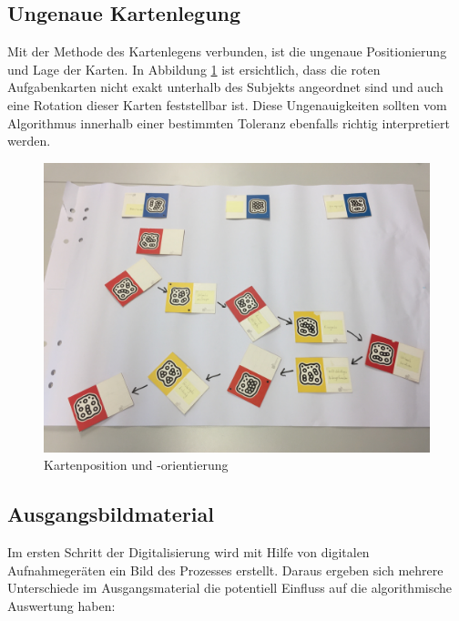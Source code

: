 \subsection{Ungenaue Kartenlegung} %
\label{ssub:ungenaue_kartenlegung}
Mit der Methode des Kartenlegens verbunden, ist die ungenaue Positionierung und Lage der Karten. In Abbildung \ref{fig:karten-position} ist ersichtlich, dass die roten Aufgabenkarten nicht exakt unterhalb des Subjekts angeordnet sind und auch eine Rotation dieser Karten feststellbar ist. Diese Ungenauigkeiten sollten vom Algorithmus innerhalb einer bestimmten Toleranz ebenfalls richtig interpretiert werden.

\begin{figure}[h]
	\centering 
	\begin{minipage}[b]{0.8\textwidth} 
		\includegraphics[width=\textwidth]{figures/02.jpg}
		\caption{Kartenposition und -orientierung  \protect~\cite{max}} 
		\label{fig:karten-position} 
	\end{minipage}
\end{figure}

\subsection{Ausgangsbildmaterial} %
\label{sub:ausgangsbildmaterial}
Im ersten Schritt der Digitalisierung wird mit Hilfe von digitalen Aufnahmegeräten ein Bild des Prozesses erstellt. Daraus ergeben sich mehrere Unterschiede im Ausgangsmaterial die potentiell Einfluss auf die algorithmische Auswertung haben:

